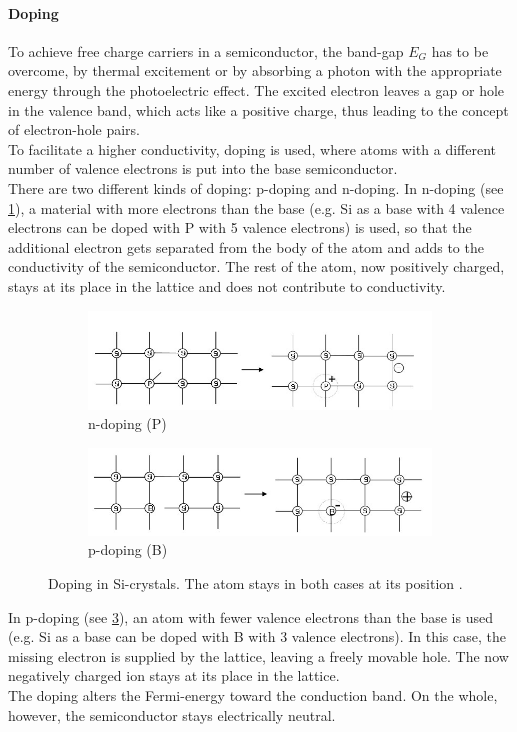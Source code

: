 \documentclass[english,  %
parskip=full,  %
headsepline]{scrartcl}
\begin{document}
\paragraph{Doping}
To achieve free charge carriers in a semiconductor, the band-gap $E_G$ has to be overcome, by thermal excitement or by absorbing a photon with the appropriate energy through the photoelectric effect. The excited electron leaves a gap or hole in the valence band, which acts like a positive charge, thus leading to the concept of electron-hole pairs. \\
To facilitate a higher conductivity, doping is used, where atoms with a different number of valence electrons is put into the base semiconductor. \\
There are two different kinds of doping: p-doping and n-doping. In n-doping (see \cref{fig:ndoping}), a material with more electrons than the base (e.g. Si as a base with 4 valence electrons can be doped with P with 5 valence electrons) is used, so that the additional electron gets separated from the body of the atom and adds to the conductivity of the semiconductor. The rest of the atom, now positively charged, stays at its place in the lattice and does not contribute to conductivity.\\
\begin{figure}[H]
\centering
  \begin{subfigure}{0.9\textwidth}
    \centering
    \includegraphics[width=\linewidth]{ndoping.jpg}
    \caption{n-doping (P)}
    \label{fig:ndoping}
\end{subfigure}
\begin{subfigure}{0.9\textwidth}
    \centering
    \includegraphics[width=\linewidth]{pdoping.jpg}
    \caption{p-doping (B)}
    \label{fig:pdoping}
\end{subfigure}
\caption{Doping in Si-crystals. The atom stays in both cases at its position \cite{instructions}.}
\end{figure}
In p-doping (see \cref{fig:pdoping}), an atom with fewer valence electrons than the base is used (e.g. Si as a base can be doped with B with 3 valence electrons). In this case, the missing electron is supplied by the lattice, leaving a freely movable hole. The now negatively charged ion stays at its place in the lattice.\\
The doping alters the Fermi-energy toward the conduction band. On the whole, however, the semiconductor stays electrically neutral.
\end{document}
